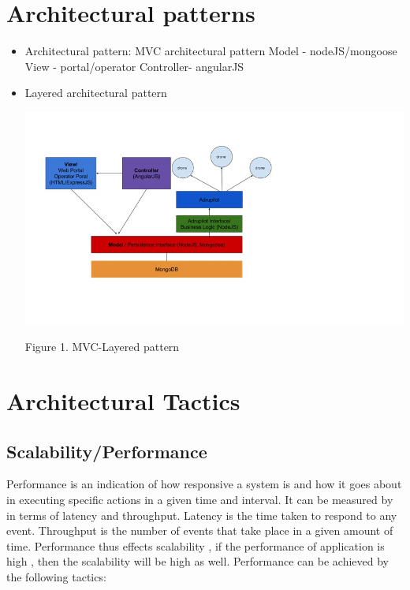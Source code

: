 \documentclass{article}
\begin{document}
	\section{Architectural patterns}%
	
	\begin{itemize}
	
	\item Architectural pattern:
	MVC architectural pattern
	Model - nodeJS/mongoose
	View - portal/operator
	Controller- angularJS
	
	\item Layered architectural pattern
	
	
	 
	
	\includegraphics{MVCLayered}
	
	Figure 1. MVC-Layered pattern
	
	\end{itemize}
	
	
	
	
	\section{Architectural Tactics}%
	\subsection{Scalability/Performance }
	Performance is an indication of how responsive a system is and how it goes about in executing specific actions in a given time and interval. It can be measured by in terms of latency and throughput.
	Latency is the time taken to respond to any event. Throughput is the number of events that take place in a given amount of time. Performance thus effects scalability , if the performance of application is high , then the scalability will be high as well. Performance can be achieved by the following tactics:
\end{document}
